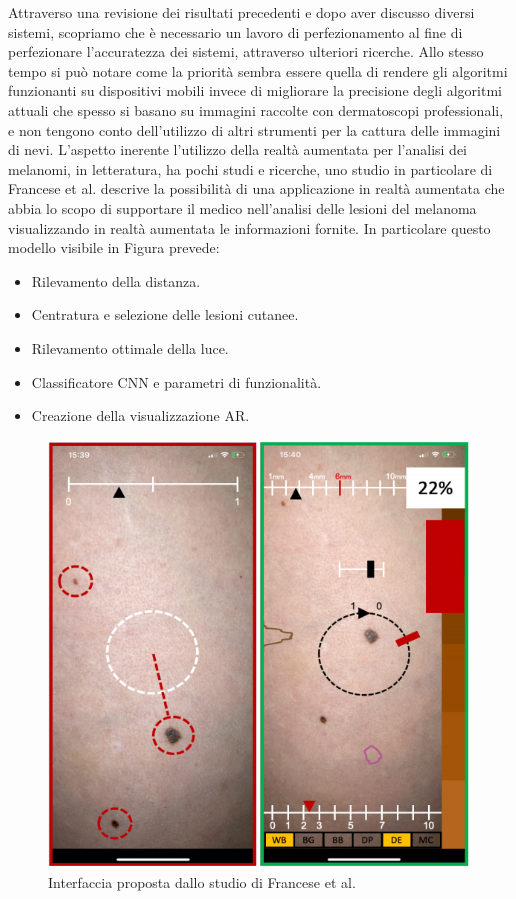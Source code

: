 {	\newline
	Attraverso una revisione dei risultati precedenti e dopo aver discusso diversi sistemi, scopriamo che 
	è necessario un lavoro di perfezionamento al fine di perfezionare l'accuratezza dei sistemi, attraverso ulteriori ricerche.
	Allo stesso tempo si può notare come la priorità sembra essere quella di rendere gli algoritmi funzionanti su dispositivi mobili invece di migliorare la precisione degli algoritmi attuali che spesso si basano su immagini raccolte con dermatoscopi professionali, e non tengono conto dell'utilizzo di altri strumenti per la cattura delle immagini di nevi.
	\newline
	\newline
	L'aspetto inerente l'utilizzo della realtà aumentata per l'analisi dei melanomi, in letteratura, ha pochi studi e ricerche, uno studio in particolare di Francese et al.  \cite{francese2020} descrive la possibilità di una applicazione in realtà aumentata che abbia lo scopo di supportare il medico nell'analisi delle lesioni del melanoma visualizzando in realtà aumentata le informazioni fornite.
	In particolare questo modello visibile in Figura prevede:
	\begin{itemize}
		\item Rilevamento della distanza.
		\item Centratura e selezione delle lesioni cutanee. 
		\item Rilevamento ottimale della luce.
		\item Classificatore CNN e parametri di funzionalità.
		\item Creazione della visualizzazione AR.
	\end{itemize}
\begin{figure}[h]
	\begin{center}
		\includegraphics[scale=0.6]{figure/capitolo2/app.png}
	\end{center}
		\caption{Interfaccia proposta dallo studio di Francese et al.}	
\end{figure}
}
